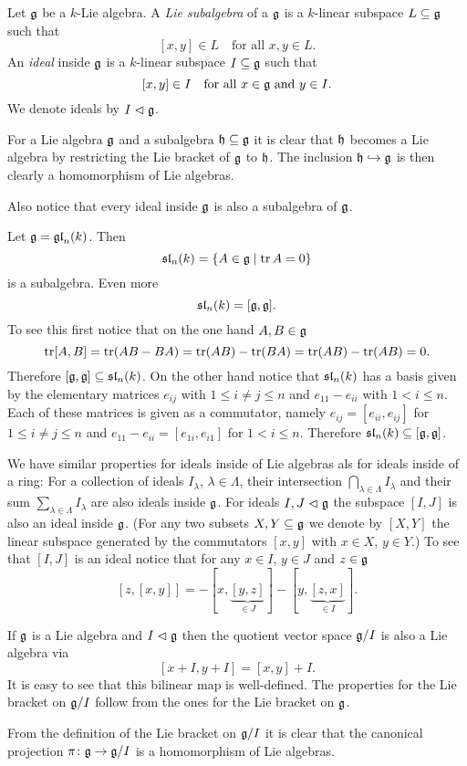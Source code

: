 \begin{defi}
 Let $\mathfrak{g}$ be a $k$-Lie algebra. A \emph{Lie subalgebra} of a $\mathfrak{g}$ is a $k$-linear subspace $L \subseteq \mathfrak{g}$ such that
 \[
  [x,y] \in L \quad \text{for all $x,y \in L$}.
 \]
 An \emph{ideal} inside $\mathfrak{g}$ is a $k$-linear subspace $I \subseteq \mathfrak{g}$ such that
 \[
  [x,y] \in I \quad \text{for all $x \in \mathfrak{g}$ and $y \in I$}.
 \]
 We denote ideals by $I \vartriangleleft \mathfrak{g}$.
\end{defi}


For a Lie algebra $\mathfrak{g}$ and a subalgebra $\mathfrak{h} \subseteq \mathfrak{g}$ it is clear that $\mathfrak{h}$ becomes a Lie algebra by restricting the Lie bracket of $\mathfrak{g}$ to $\mathfrak{h}$. The inclusion $\mathfrak{h} \hookrightarrow \mathfrak{g}$  is then clearly a homomorphism of Lie algebras.

Also notice that every ideal inside $\mathfrak{g}$ is also a subalgebra of $\mathfrak{g}$.


\begin{expl}
 Let $\mathfrak{g} = \mathfrak{gl}_n(k)$. Then
 \[
  \mathfrak{sl}_n(k) = \{A \in \mathfrak{g} \mid \operatorname{tr} A = 0\}
 \]
 is a subalgebra. Even more
 \[
  \mathfrak{sl}_n(k) = [\mathfrak{g},\mathfrak{g}].
 \]
 To see this first notice that on the one hand $A, B \in \mathfrak{g}$
 \[
  \operatorname{tr} [A,B]
  = \operatorname{tr}(AB-BA)
  = \operatorname{tr}(AB) - \operatorname{tr}(BA)
  = \operatorname{tr}(AB) - \operatorname{tr}(AB)
  = 0.
 \]
 Therefore $[\mathfrak{g},\mathfrak{g}] \subseteq \mathfrak{sl}_n(k)$. On the other hand notice that $\mathfrak{sl}_n(k)$ has a basis given by the elementary matrices $e_{ij}$ with $1 \leq i \neq j \leq n$ and $e_{11} - e_{ii}$ with $1 < i \leq n$. Each of these matrices is given as a commutator, namely $e_{ij} = [e_{ii},e_{ij}]$ for $1 \leq i \neq j \leq n$ and $e_{11} - e_{ii} = [e_{1i},e_{i1}]$ for $1 < i \leq n$. Therefore $\mathfrak{sl}_n(k) \subseteq [\mathfrak{g},\mathfrak{g}]$.
\end{expl}



We have similar properties for ideals inside of Lie algebras als for ideals inside of a ring: For a collection of ideals $I_\lambda$, $\lambda \in \Lambda$, their intersection $\bigcap_{\lambda \in \Lambda} I_\lambda$ and their sum $\sum_{\lambda \in \Lambda} I_\lambda$ are also ideals inside $\mathfrak{g}$. For ideals $I, J \vartriangleleft \mathfrak{g}$ the subspace $[I,J]$ is also an ideal inside $\mathfrak{g}$. (For any two subsets $X, Y \subseteq \mathfrak{g}$ we denote by $[X,Y]$ the linear subspace generated by the commutators $[x,y]$ with $x \in X$, $y \in Y$.) To see that $[I,J]$ is an ideal notice that for any $x \in I$, $y \in J$ and $z \in \mathfrak{g}$
\[
 [z,[x,y]] = -[x,\underbrace{[y,z]}_{\in J}]-[y,\underbrace{[z,x]}_{\in I}].
\]


\begin{rem}
 If $\mathfrak{g}$ is a Lie algebra and $I \vartriangleleft \mathfrak{g}$ then the quotient vector space $\mathfrak{g}/I$ is also a Lie algebra via
 \[
  [x+I, y+I] = [x,y] + I.
 \]
 It is easy to see that this bilinear map is well-defined. The properties for the Lie bracket on $\mathfrak{g}/I$ follow from the ones for the Lie bracket on $\mathfrak{g}$.
 
 From the definition of the Lie bracket on $\mathfrak{g}/I$ it is clear that the canonical projection $\pi \colon \mathfrak{g} \to \mathfrak{g}/I$ is a homomorphism of Lie algebras.
\end{rem}


